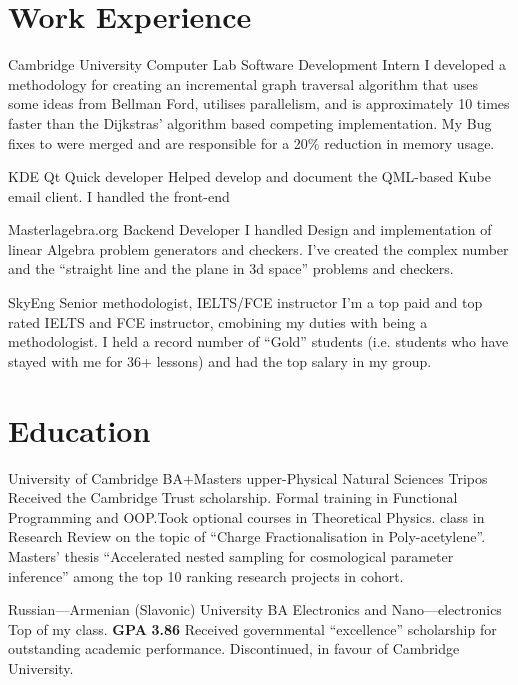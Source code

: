 \documentclass{CurriculumVitae}[10pt, draft, condensed]
\begin{document}
 \section*{Work Experience} {\setlength{\parindent}{0in}
   

    {Cambridge University Computer Lab}
   {Software Development Intern} {I developed a methodology for
     creating an incremental graph traversal algorithm that uses some
     ideas from Bellman Ford, utilises parallelism, and is
     approximately 10 times faster than the Dijkstras' algorithm based
     competing implementation. My Bug fixes to  were
     merged and are responsible for a 20\% reduction in memory
     usage. }


   {KDE}
   {Qt Quick developer} {Helped develop and document the QML-based Kube email client. I handled the  front-end }


    {Masterlagebra.org} {Backend Developer} {I
     handled Design and implementation of linear Algebra problem
     generators and checkers. I've created the complex number
     and the ``straight line and the plane in 3d space'' problems and
     checkers. }

 {SkyEng} {Senior methodologist, IELTS/FCE
     instructor} {I'm a top paid and top rated IELTS and FCE
     instructor, cmobining my duties with being a methodologist. I
     held a record number of ``Gold'' students (i.e. students who have
     stayed with me for 36+ lessons) and had the top salary in my
     group. }



\section*{Education}

 {University of Cambridge} {BA+Masters
  upper-}{Physical Natural Sciences Tripos} {Received the
  Cambridge Trust scholarship. Formal training in Functional
  Programming and OOP.\@ Took optional courses in Theoretical
  Physics.  class in Research Review on the topic of ``Charge
  Fractionalisation in Poly-acetylene''. Masters' thesis ``Accelerated
  nested sampling for cosmological parameter inference'' among the top
  10 ranking research projects in cohort. }

 {Russian---Armenian (Slavonic) University}
{BA }{Electronics and Nano---electronics} {Top of my class. \textbf{GPA}
  \textbf{3.86} Received governmental ``excellence'' scholarship for
  outstanding academic performance. Discontinued, in favour of
  Cambridge University.}

}
\end{document}
